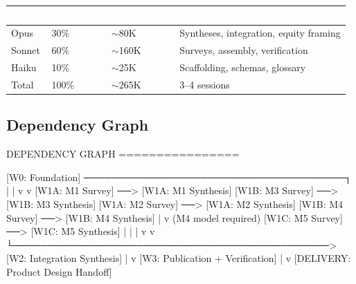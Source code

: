 \documentclass[11pt,letterpaper]{article}
\newcommand{\tableheader}[1]{\textbf{\sffamily\textcolor{white}{#1}}}
\begin{document}
\begin{center}
\begin{tabularx}{\textwidth}{L{2.5cm}C{2.5cm}C{2.5cm}X}
\toprule
{}
\tableheader{Model} & \tableheader{Allocation} & \tableheader{Est.\ Tokens} & \tableheader{Primary Tasks} \\
\midrule
Opus & 30\% & $\sim$80K & Syntheses, integration, equity framing \\
Sonnet & 60\% & $\sim$160K & Surveys, assembly, verification \\
Haiku & 10\% & $\sim$25K & Scaffolding, schemas, glossary \\
\hline
Total & 100\% & $\sim$265K & 3--4 sessions \\
\bottomrule
\end{tabularx}
\end{center}

\subsection{Dependency Graph}

\begin{asciibox}
DEPENDENCY GRAPH
================

[W0: Foundation] ──────────────────────────────────────┐
      |                                                 |
      v                                                 v
[W1A: M1 Survey] ──> [W1A: M1 Synthesis]    [W1B: M3 Survey] ──> [W1B: M3 Synthesis]
[W1A: M2 Survey] ──> [W1A: M2 Synthesis]    [W1B: M4 Survey] ──> [W1B: M4 Synthesis]
                                                        |
                                                        v (M4 model required)
                                             [W1C: M5 Survey] ──> [W1C: M5 Synthesis]
                                                        |
      |                                                 |
      v                                                 v
      └──────────────────────────────────────────────> [W2: Integration Synthesis]
                                                        |
                                                        v
                                             [W3: Publication + Verification]
                                                        |
                                                        v
                                             [DELIVERY: Product Design Handoff]
\end{asciibox}
\end{document}
